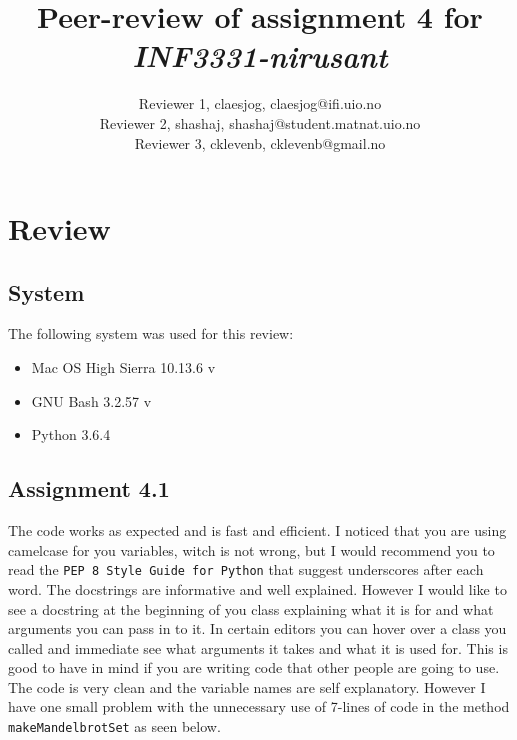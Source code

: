 \documentclass[a4paper]{article}
\title{Peer-review of assignment 4 for \textit{INF3331-nirusant}}
\author{Reviewer 1, claesjog, {claesjog@ifi.uio.no} \\
    	Reviewer 2, shashaj, {shashaj@student.matnat.uio.no} \\
	    Reviewer 3, cklevenb, {cklevenb@gmail.no}}
\begin{document}
\maketitle


\section{Review}

\subsection*{System}
The following system was used for this review:
\newline
\begin{itemize}
    \item Mac OS High Sierra 10.13.6 v
    \item GNU Bash 3.2.57 v
    \item Python 3.6.4
\end{itemize}

\subsection*{Assignment 4.1}
The code works as expected and is fast and efficient. I noticed that you are using camelcase for you variables, witch is not wrong, but I would recommend you to read the \texttt{PEP 8 Style Guide for Python} that suggest underscores after each word.
\newline\newline
The docstrings are informative and well explained. However I would like to see a docstring at the beginning of you class explaining what it is for and what arguments you can pass in to it. In certain editors you can hover over a class you called and immediate see what arguments it takes and what it is used for. This is good to have in mind if you are writing code that other people are going to use. 
\newline\newline
The code is very clean and the variable names are self explanatory. However I have one small problem with the unnecessary use of 7-lines of code in the method \texttt{makeMandelbrotSet} as seen below.
\end{document}
